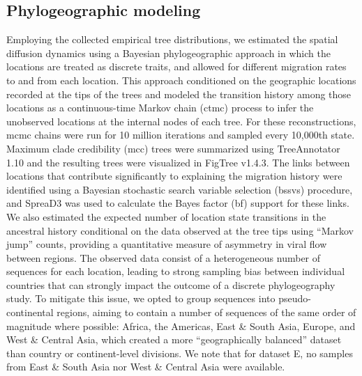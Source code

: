 \subsection{Phylogeographic modeling}

Employing the collected empirical tree distributions, we estimated the spatial diffusion dynamics using a Bayesian phylogeographic approach in which the locations are treated as discrete traits, and allowed for different migration rates to and from each location.
This approach conditioned on the geographic locations recorded at the tips of the trees and modeled the transition history among those locations as a continuous-time Markov chain (\gls{ctmc}) process to infer the unobserved locations at the internal nodes of each tree.
For these reconstructions, \gls{mcmc} chains were run for 10 million iterations and sampled every 10,000th state.
Maximum clade credibility (\gls{mcc}) trees were summarized using TreeAnnotator 1.10 \cite{suchard2018bayesian} and the resulting trees were visualized in FigTree v1.4.3.
The links between locations that contribute significantly to explaining the migration history were identified using a Bayesian stochastic search variable selection (\gls{bssvs}) procedure, and SpreaD3 \cite{bielejec2016spread3} was used to calculate the Bayes factor (\gls{bf}) support for these links.
We also estimated the expected number of location state transitions in the ancestral history conditional on the data observed at the tree tips using ``Markov jump'' counts, providing a quantitative measure of asymmetry in viral flow between regions.
The observed data consist of a heterogeneous number of sequences for each location, leading to strong sampling bias between individual countries that can strongly impact the outcome of a discrete phylogeography study.
To mitigate this issue, we opted to group sequences into pseudo-continental regions, aiming to contain a number of sequences of the same order of magnitude where possible: Africa, the Americas, East \& South Asia, Europe, and West \& Central Asia, which created a more ``geographically balanced'' dataset than country or continent-level divisions.
We note that for dataset E, no samples from East \& South Asia nor West \& Central Asia were available.

